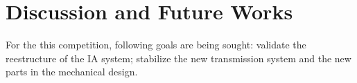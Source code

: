 \section{Discussion and Future Works}\label{dic_fut_sec}

For the this competition, following goals are being sought: validate the
reestructure of the IA system; stabilize the new transmission system and the
new parts in the mechanical design.

